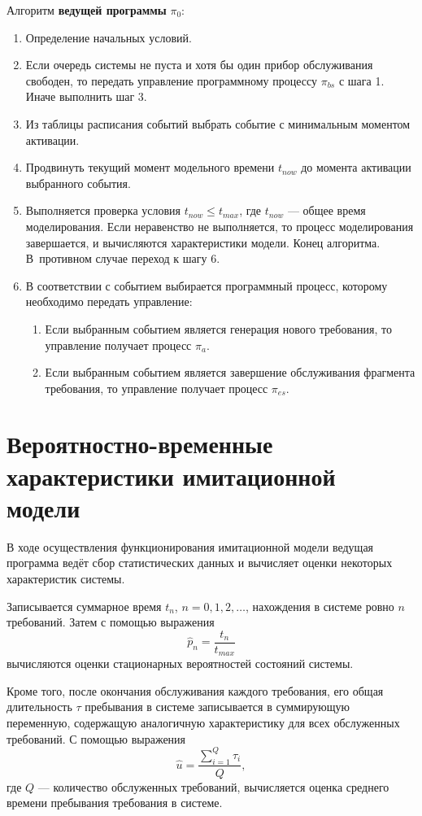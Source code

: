 \documentclass[bachelor, och, pract, times]{SCWorks}
\begin{document}
Алгоритм \textbf{ведущей программы} $\pi_0$:
    \begin{enumerate}
        \item Определение начальных условий. 
        \item Если очередь системы не пуста и хотя бы один прибор обслуживания свободен, то передать управление программному процессу $\pi_{bs}$ с шага 1. Иначе выполнить шаг 3.
        \item Из таблицы расписания событий выбрать событие с минимальным моментом активации.
        \item Продвинуть текущий момент модельного времени $t_{now}$ до момента активации выбранного события.
        \item Выполняется проверка условия $t_{now} \leq t_{max}$, где $t_{now}$ — общее время моделирования. Если неравенство не выполняется, то процесс моделирования завершается, и вычисляются характеристики модели. Конец алгоритма. В противном случае переход к шагу 6.
        \item В соответствии с событием выбирается программный процесс, которому необходимо передать управление:
        \begin{enumerate}
            \item Если выбранным событием является генерация нового требования, то управление получает процесс $\pi_{a}$.
            \item Если выбранным событием является завершение обслуживания фрагмента требования, то управление получает процесс $\pi_{es}$.
        \end{enumerate}
    \end{enumerate}
    
\section{Вероятностно-временные характеристики имитационной модели}

В ходе осуществления функционирования имитационной модели ведущая программа ведёт сбор статистических данных и вычисляет оценки некоторых характеристик системы. 

Записывается суммарное время $t_n$, $n=0,1,2,\dots$, нахождения в системе ровно $n$ требований. Затем с помощью выражения
\[\hat{p}_n = \frac{t_n}{t_{max}}\] 
вычисляются оценки стационарных вероятностей состояний системы.

Кроме того, после окончания обслуживания каждого требования, его общая длительность $\tau$ пребывания в системе записывается в суммирующую переменную, содержащую аналогичную характеристику для всех обслуженных требований. С помощью выражения 
\[\hat{u} = \frac{\sum \limits^Q_{i = 1} \tau_i}{Q},\]
где $Q$ — количество обслуженных требований, вычисляется оценка среднего времени пребывания требования в системе.
\end{document}
